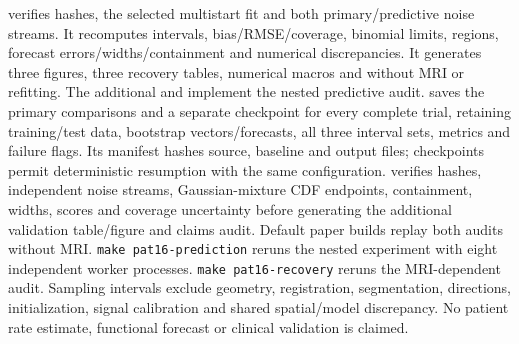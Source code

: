  verifies hashes, the selected multistart fit and both primary/predictive noise streams. It recomputes intervals, bias/RMSE/coverage, binomial limits, regions, forecast errors/widths/containment and numerical discrepancies. It generates three figures, three recovery tables, numerical macros and  without MRI or refitting. The additional  and  implement the nested predictive audit.  saves the primary comparisons and a separate checkpoint for every complete trial, retaining training/test data, bootstrap vectors/forecasts, all three interval sets, metrics and failure flags. Its manifest hashes source, baseline and output files; checkpoints permit deterministic resumption with the same configuration.  verifies hashes, independent noise streams, Gaussian-mixture CDF endpoints, containment, widths, scores and coverage uncertainty before generating the additional validation table/figure and claims audit. Default paper builds replay both audits without MRI. \texttt{make pat16-prediction} reruns the nested experiment with eight independent worker processes. \texttt{make pat16-recovery} reruns the MRI-dependent audit. Sampling intervals exclude geometry, registration, segmentation, directions, initialization, signal calibration and shared spatial/model discrepancy. No patient rate estimate, functional forecast or clinical validation is claimed.
